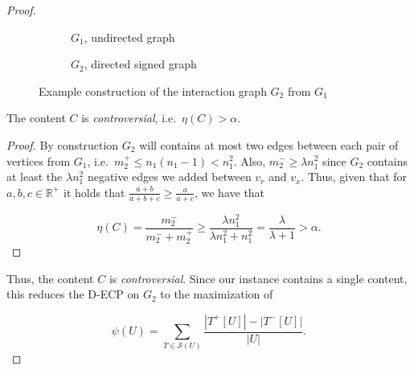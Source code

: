 \begin{proof}
	\begin{figure}
		\begin{center}
			\begin{subfigure}[b]{0.4\textwidth}
				\centering
				\vspace{30pt}
				\caption{$G_{1}$, undirected graph}
				\label{fig:g1_example}
			\end{subfigure}
			\begin{subfigure}[b]{0.4\textwidth}
				\centering
				\caption{$G_{2}$, directed signed graph}
				\label{fig:g2_example}
			\end{subfigure}
		\end{center}
		\caption[Example reduction from MIS to \acrshort{D-ECP}]{Example construction of the interaction graph $G_{2} $ from
			$G_{1} $}
		\label{fig:construction-densest}
	\end{figure}

	\begin{claim}
		\label{th:claim-controversial-densest}
		The content $C$ is \emph{controversial}, i.e.\ $\eta(C) > \alpha $.
	\end{claim}
	\begin{proof}
		By construction $G_2$ will contains at most two edges between each
		pair of vertices from $G_1$, i.e.\ $m_{2}^{+} \leq n_1 (n_1 -1 ) <
			n_{1}^{2}  $. Also, $m_{2}^{-} \geq
			\lambda n_{1}^{2} $ since $G_2$ contains at least the $\lambda
			n_1^2$ negative edges we added between $v_r$ and $v_x$.
		Thus, given that for $a, b, c \in \mathbb{R}^{+}$ it holds that $\frac{a +
				b}{a + b + c} \geq \frac{a}{a + c} $, we have that

		\begin{equation}
			\eta(C) = \frac{m_{2}^{-} }{m_{2}^{-} +
				m_{2}^{+} } \geq \frac{\lambda n_{1} ^{2} }{\lambda n_{1}^{2}
				+ n_{1}^{2}  } = \frac{\lambda }{\lambda + 1}
			> \alpha.
		\end{equation}
	\end{proof}

	Thus, the content $C$ is \emph{controversial}. Since our instance contains
	a single content, this reduces the \acrshort{D-ECP} on $G_2$ to the maximization of

	\begin{equation}
		\label{eq:score-densest}
		\psi(U) = \sum^{}_{T \in \mathcal{S}(U) } \frac{| T^{+}[U] | - |
			T^{-}[U] |}{|U|}.
	\end{equation}


\end{proof}
